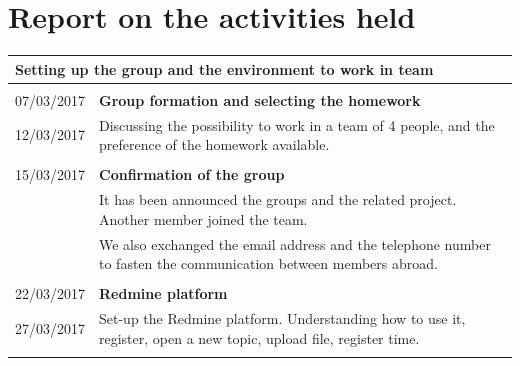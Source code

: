 %



\chapter{Report on the activities held}
\begin{table}[h]
	\begin{tabular}{p{2.1cm}|  p{13.5cm}}
\multicolumn{2}{p{15.0cm}}{ \LARGE{{Setting up the group and the environment to work in team}}}\\
\hline \hline 
\multicolumn{2}{p{1.0cm}}{ \Large{{}}}\\
	07/03/2017 & \textbf{Group formation and selecting the homework}\\
	12/03/2017& Discussing the possibility to work in a team of 4 people, and the preference of the homework available. \\
	\multicolumn{2}{p{1.0cm}}{ \Large{{ }}}\\	
	15/03/2017 & \textbf{Confirmation of the group}	 \\
	&It has been announced the groups and the related project. Another member joined the team. \\
	&We also exchanged the email address and the telephone number to fasten the communication between members abroad.\\
		\multicolumn{2}{p{1.0cm}}{ \Large{{ }}}\\
		22/03/2017 & \textbf{Redmine platform}\\
		27/03/2017& Set-up the Redmine platform. Understanding how to use it, register, open a new topic, upload file, register time. \\
		\multicolumn{2}{p{1.0cm}}{ \Large{{ }}}\\	

\end{tabular}
\end{table}	
